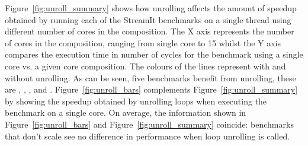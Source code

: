 Figure~\ref{fig:unroll_summary} shows how unrolling affects the amount of speedup obtained by running each of the StreamIt benchmarks on a single thread using different number of cores in the composition.
The X axis represents the number of cores in the composition, ranging from single core to 15 whilst the Y axis compares the execution time in number of cycles for the benchmark using a single core vs. a given core composition.
The colours of the lines represent with and without unrolling.
As can be seen, five benchmarks benefit from unrolling, these are , , ,  and . 
Figure~\ref{fig:unroll_bars} complements Figure~\ref{fig:unroll_summary} by showing the speedup obtained by unrolling loops when executing the benchmark on a single core.
On average, the information shown in Figure~\ref{fig:unroll_bars} and Figure~\ref{fig:unroll_summary} coincide: benchmarks that don't scale see no difference in performance when loop unrolling is called.

